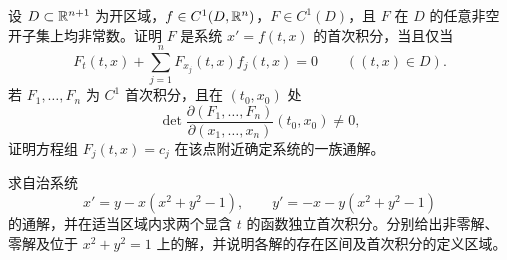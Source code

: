 \noindent\begin{minipage}{\linewidth}
设 $D\subset\mathbb R^{n+1}$ 为开区域，$f\in C^1(D,\mathbb R^n)$，$F\in C^1(D)$，且 $F$ 在 $D$ 的任意非空开子集上均非常数。证明 $F$ 是系统 $x'=f(t,x)$ 的首次积分，当且仅当
\[F_t(t,x)+\sum_{j=1}^nF_{x_j}(t,x)f_j(t,x)=0\qquad((t,x)\in D).\]
若 $F_1,\ldots,F_n$ 为 $C^1$ 首次积分，且在 $(t_0,x_0)$ 处
\[\det\frac{\partial(F_1,\ldots,F_n)}{\partial(x_1,\ldots,x_n)}(t_0,x_0)\ne0,\]
证明方程组 $F_j(t,x)=c_j$ 在该点附近确定系统的一族通解。
\end{minipage}\par\vspace{5pt}
\noindent\begin{minipage}{\linewidth}
求自治系统
\[x'=y-x(x^2+y^2-1),\qquad y'=-x-y(x^2+y^2-1)\]
的通解，并在适当区域内求两个显含 $t$ 的函数独立首次积分。分别给出非零解、零解及位于 $x^2+y^2=1$ 上的解，并说明各解的存在区间及首次积分的定义区域。
\end{minipage}\par\vspace{5pt}
